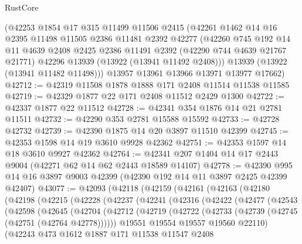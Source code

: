\begin{lexlean}{RustCore}
\begin{coremodule}
    (@42253
      @1854
      @17
      @315
      @11499
      @11506
      @2415
      (@42261
        @1462
        @14
        @16
        @2395
        @11498
        @11505
        @2386
        @11481
        @2392
        @42277
        (@42260
          @745
          @192
          @14
          @11
          @4639
          @2408
          @2425
          @2386
          @11491
          @2392
          (@42290 @744 @4639 @21767 @21771)
          @42296
          @13939
          (@13922 (@13941 @11492 @2408)))
        @13939
        (@13922 (@13941 @11482 @11498)))
      @13957
      @13961
      @13966
      @13971
      @13977
      @17662)
@42712 := @42319 @11508 @1878 @1888 @171 @2408 @11514 @11538 @11585
@42719 := @42329 @1877 @22 @171 @2408 @11512 @2429 @1300
@42722 := @42337 @1877 @22 @11512
@42728 := @42341 @354 @1876 @14 @21 @2781 @11511
@42732 := @42290 @353 @2781 @15588 @15592
@42733 := @42728 @42732
@42739 := @42390 @1875 @14 @20 @3897 @11510 @42399
@42745 := @42353 @1598 @14 @19 @3610 @9928 @42362
@42751 := @42353 @1597 @14 @18 @3610 @9927 @42362
@42764 := @42341 @207 @1404 @14 @17 @2443 @9004 (@42271 @62 @14 @62 @2443 @18589 @14107)
@42778 := @42390 @995 @14 @16 @3897 @9003 @42399 (@42390 @192 @14 @11 @3897 @2425 @42399 @42407)
@43077 := @42093
    (@42118
      (@42159
        (@42161
          (@42163
            (@42180
              (@42198
                (@42215
                  (@42228
                    (@42237
                      (@42241
                        (@42316
                          (@42422
                            (@42477
                              (@42543
                                (@42598
                                  (@42645
                                    (@42704
                                      (@42712
                                        (@42719
                                          (@42722
                                            (@42733 (@42739 (@42745 (@42751 (@42764 @42778))))))
                                          @19551
                                          @19554
                                          @19557
                                          @19560
                                          @22110)
                                        (@42243
                                          @473
                                          @1612
                                          @1887
                                          @171
                                          @11538
                                          @11547
                                          @2408

\end{coremodule}
\end{lexlean}
